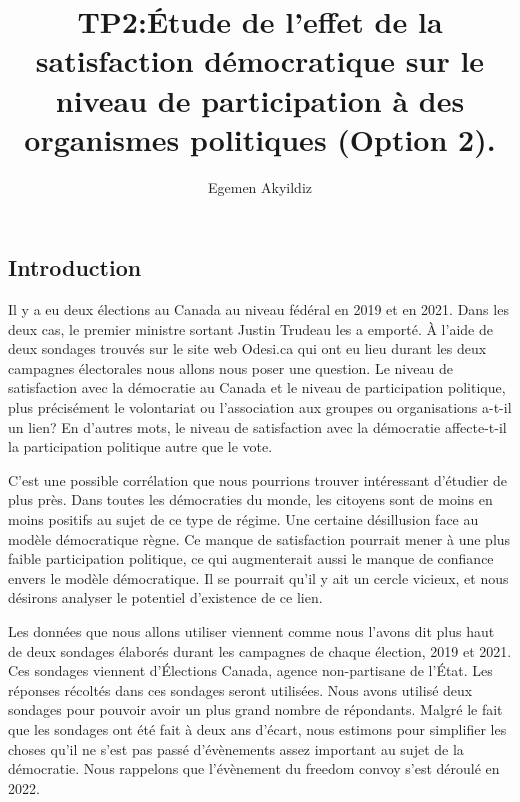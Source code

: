 \documentclass[
  letterpaper,
  DIV=11,
  numbers=noendperiod]{scrartcl}
\title{TP2:Étude de l'effet de la satisfaction démocratique sur le
niveau de participation à des organismes politiques (Option 2).}
\author{Egemen Akyildiz}
\date{}
\begin{document}
\maketitle
\ifdefined\Shaded\renewenvironment{Shaded}{\begin{tcolorbox}[breakable, boxrule=0pt, borderline west={3pt}{0pt}{shadecolor}, sharp corners, interior hidden, frame hidden, enhanced]}{\end{tcolorbox}}\fi

\hypertarget{introduction}{%
\subsection{Introduction}\label{introduction}}

Il y a eu deux élections au Canada au niveau fédéral en 2019 et en 2021.
Dans les deux cas, le premier ministre sortant Justin Trudeau les a
emporté. À l'aide de deux sondages trouvés sur le site web Odesi.ca qui
ont eu lieu durant les deux campagnes électorales nous allons nous poser
une question. Le niveau de satisfaction avec la démocratie au Canada et
le niveau de participation politique, plus précisément le volontariat ou
l'association aux groupes ou organisations a-t-il un lien? En d'autres
mots, le niveau de satisfaction avec la démocratie affecte-t-il la
participation politique autre que le vote.

C'est une possible corrélation que nous pourrions trouver intéressant
d'étudier de plus près. Dans toutes les démocraties du monde, les
citoyens sont de moins en moins positifs au sujet de ce type de régime.
Une certaine désillusion face au modèle démocratique règne. Ce manque de
satisfaction pourrait mener à une plus faible participation politique,
ce qui augmenterait aussi le manque de confiance envers le modèle
démocratique. Il se pourrait qu'il y ait un cercle vicieux, et nous
désirons analyser le potentiel d'existence de ce lien.

Les données que nous allons utiliser viennent comme nous l'avons dit
plus haut de deux sondages élaborés durant les campagnes de chaque
élection, 2019 et 2021. Ces sondages viennent d'Élections Canada, agence
non-partisane de l'État. Les réponses récoltés dans ces sondages seront
utilisées. Nous avons utilisé deux sondages pour pouvoir avoir un plus
grand nombre de répondants. Malgré le fait que les sondages ont été fait
à deux ans d'écart, nous estimons pour simplifier les choses qu'il ne
s'est pas passé d'évènements assez important au sujet de la démocratie.
Nous rappelons que l'évènement du freedom convoy s'est déroulé en 2022.
\end{document}
